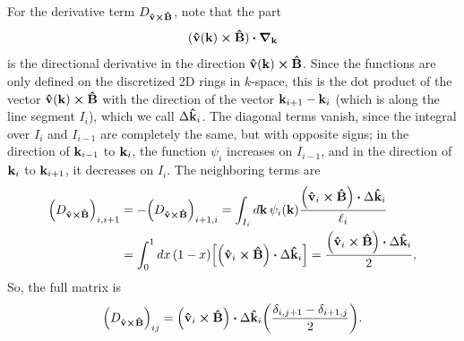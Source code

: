 \documentclass[12pt]{article}
\begin{document}
For the derivative term $D_{\vu{v}\cross\vu{B}}$, note that the part
\begin{equation}
    (\vu{v}(\vb{k})\cross\vu{B})\vdot\grad_{\vb{k}}
\end{equation}
is the directional derivative in the direction $\vu{v}(\vb{k})\cross\vu{B}$. Since the functions are
only defined on the discretized 2D rings in $k$-space, this is the dot product of the vector
$\vu{v}(\vb{k})\cross\vu{B}$ with the direction of the vector $\vb{k}_{i+1} - \vb{k}_i$ (which is
along the line segment $I_i$), which we call $\Delta\vu{k}_i$. The diagonal terms vanish, since the
integral over $I_i$ and $I_{i-1}$ are completely the same, but with opposite signs; in the
direction of $\vb{k}_{i-1}$ to $\vb{k}_i$, the function $\psi_i$ increases on $I_{i-1}$, and in the
direction of $\vb{k}_i$ to $\vb{k}_{i+1}$, it decreases on $I_i$. The neighboring terms are
\begin{equation}
\begin{aligned}
    \qty(D_{\vu{v}\cross\vu{B}})_{i,i+1} &= -\qty(D_{\vu{v}\cross\vu{B}})_{i+1,i}
        = \int_{I_i} \dd{\vb{k}} \psi_i(\vb{k})
        \frac{\qty(\vu{v}_i\cross\vu{B})\vdot\Delta\vu{k}_i}{\ell_i} \\
    &= \int_0^1 \dd{x} (1-x) \qty[\qty(\vu{v}_i\cross\vu{B})\vdot\Delta\vu{k}_i]
    = \frac{\qty(\vu{v}_i\cross\vu{B})\vdot\Delta\vu{k}_i}{2},
\end{aligned}
\end{equation}
So, the full matrix is
\begin{equation}
    \qty(D_{\vu{v}\cross\vu{B}})_{ij} = \qty(\vu{v}_i\cross\vu{B})\vdot\Delta\vu{k}_i
    \qty(\frac{\delta_{i,j+1} - \delta_{i+1,j}}{2}).
\end{equation}
\end{document}
